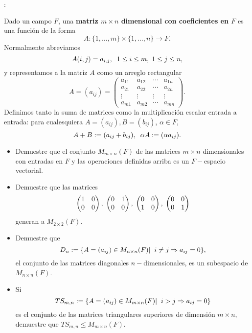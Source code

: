 \begin{ej}
: 

Dado un campo $F$, una \textbf{matriz 
$m \times n$ dimensional con coeficientes en $F$}
es una función de la forma
\[
A : \{ 1, \ldots, m \} \times 
\{ 1, \ldots, n \} \longrightarrow F.
\]
Normalmente abreviamos
\[
A(i, j) = a_{i,j},
\hspace{0.2cm} 1 \leq i \leq m, \hspace{0.1cm}
1 \leq j \leq n,
\]
y representamos a la matriz $A$ como un arreglo rectangular
\[
A = (a_{ij}) =
\begin{pmatrix}
a_{11} & a_{12} & \cdots & a_{1n} \\ 
a_{21} & a_{22} & \cdots & a_{2n} \\
\vdots & \vdots & \vdots & \vdots \\
a_{m1} & a_{m2} & \cdots & a_{mn}
\end{pmatrix}.
\]
Definimos tanto la suma de matrices como la multiplicación
escalar entrada a entrada: para cualesquiera
$A = (a_{ij}), B = (b_{ij})$, $\alpha \in F$,
\[
A + B := (a_{ij} + b_{ij}), 
\hspace{0.2cm}
\alpha A := (\alpha a_{ij}).
\]

\begin{itemize}
	\item Demuestre que el conjunto $M_{m \times n}(F)$
	de las matrices $m \times n$ dimensionales con entradas en 
	$F$ y las operaciones definidas arriba es un $F-$espacio vectorial.
	\item Demuestre que las matrices 
	$$\begin{pmatrix}
1 & 0 \\
0 & 0 
\end{pmatrix},
\hspace{0.1cm}
\begin{pmatrix}
0 & 1 \\
0 & 0 
\end{pmatrix},
\hspace{0.1cm}
\begin{pmatrix}
0 & 0 \\
1 & 0 
\end{pmatrix},
\hspace{0.1cm}
\begin{pmatrix}
0 & 0 \\
0 & 1 
\end{pmatrix}
$$
generan a $M_{2 \times 2}(F)$.
	\item Demuestre que
	\[
	D_{n} := \{ A=(a_{ij}) \in M_{n \times n}(F)  | \hspace{0.2cm}
	i \neq j \Rightarrow a_{ij} = 0  \},
	\]
	el conjunto de las matrices diagonales $n-$dimensionales,
	es un subespacio de $M_{n \times n}(F)$.
	\item Si 
	\[
	TS_{m,n} := \{ A=(a_{ij}) \in M_{m \times n}(F)  | \hspace{0.2cm} 
	i > j \Rightarrow a_{ij} = 0 \}
	\]
	es el conjunto de las matrices triangulares superiores
	de dimensión $m \times n$, demuestre que
	$TS_{m,n} \leq M_{m \times n}(F)$.
\end{itemize}
\end{ej}
